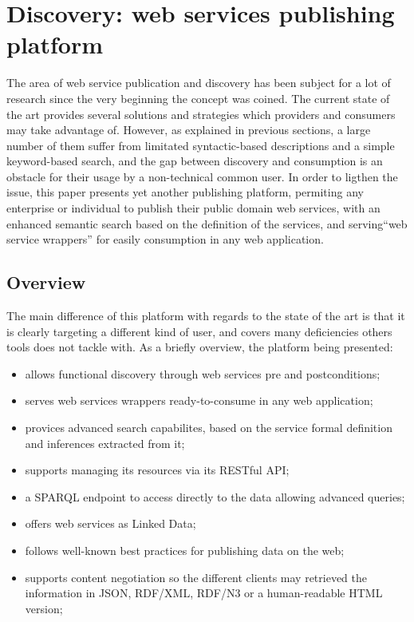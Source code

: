 
\section{Discovery: web services publishing platform}
\label{sec:discovery}

The area of web service publication and discovery has been subject for a lot of research since the very beginning the concept was coined. The current state of the art provides several solutions and strategies which providers and consumers may take advantage of. However, as explained in previous sections, a large number of them suffer from limitated syntactic-based descriptions and a simple keyword-based search, and the gap between discovery and consumption is an obstacle for their usage by a non-technical common user. In order to ligthen the issue, this paper presents yet another publishing platform, permiting any enterprise or individual to publish their public domain web services, with an enhanced semantic search based on the definition of the services, and serving``web service wrappers'' for easily consumption in any web application.

\subsection{Overview}
\label{ssec:overview}

The main difference of this platform with regards to the state of the art is that it is clearly targeting a different kind of user, and covers many deficiencies others tools does not tackle with. As a briefly overview, the platform being presented:

\begin{itemize}
  \item allows functional discovery through web services pre and postconditions;
	\item serves web services wrappers ready-to-consume in any web application;
	\item provices advanced search capabilites, based on the service formal definition and inferences extracted from it;
	\item supports managing its resources via its RESTful API;
	\item a SPARQL endpoint to access directly to the data allowing advanced queries;
	\item offers web services as Linked Data;
	\item follows well-known best practices for publishing data on the web;
	\item supports content negotiation so the different clients may retrieved the information in JSON, RDF/XML, RDF/N3 or a human-readable HTML version;
\end{itemize}

